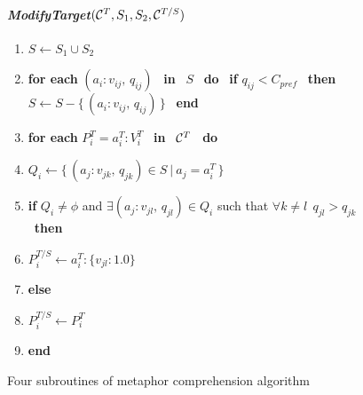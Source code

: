 \begin{figure}[p]
  \paragraph*{{\it ModifyTarget\/}$({\cal C}^T,S_1,S_2,{\cal C}^{T/S})$}
      \small
      \begin{enumerate}
        \setcounter{enumi}{\thebuf}
        \renewcommand{\theenumi}{}
        \renewcommand{\labelenumi}{}
        \addtolength{\itemsep}{-\parsep}
        \setlength{\labelsep}{-4ex}
      \item $S \leftarrow S_1 \cup S_2$
      \item {\bf for each} $(a_i\!:\!v_{ij},\,q_{ij})$ ~{\bf in}~ $S$ ~{\bf do}~
        {\bf if} $q_{ij} < C_{pref}$ ~{\bf then}~
        $S \leftarrow S - \{\,(a_i\!:\!v_{ij},\,q_{ij})\,\}$ ~{\bf end}
      \item {\bf for each} $P^T_i = a^T_i\!\!:\!V^T_i$ ~{\bf in}~ ${\cal C}^T$ ~{\bf do}
      \item \hspace*{4ex} $Q_i\leftarrow\{\,(a_j\!:\!v_{jk},\,q_{jk}) \in S ~|~ a_j = a^T_i\,\}$
      \item \hspace*{4ex} {\bf if} $Q_i \neq \phi$ and $\exists (a_j\!:\!v_{jl},\,q_{jl}) \in Q_i$
        such that $\forall k \neq l~~ q_{jl} > q_{jk}$ ~{\bf then}
      \item \hspace*{8ex} $P^{T/S}_i \leftarrow a^T_i\!:\!\{v_{jl}\!:\!1.0\}$
      \item \hspace*{4ex} {\bf else}
      \item \hspace*{8ex} $P^{T/S}_i \leftarrow P^T_i$
      \item {\bf end}
      \end{enumerate}
  \caption{Four subroutines of metaphor comprehension algorithm}
  \label{fig:subalgo}
\end{figure}


